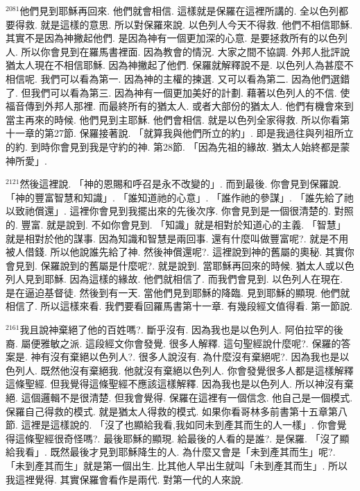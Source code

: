 \documentclass{book}
\begin{document}
$^{2081}$他們見到耶穌再回來.
他們就會相信.
這樣就是保羅在這裡所講的.
全以色列都要得救.
就是這樣的意思.
所以對保羅來說.
以色列人今天不得救.
他們不相信耶穌.
其實不是因為神撇起他們.
是因為神有一個更加深的心意.
是要拯救所有的以色列人.
所以你會見到在羅馬書裡面.
因為教會的情況.
大家之間不協調.
外邦人批評說猶太人現在不相信耶穌.
因為神撇起了他們.
保羅就解釋說不是.
以色列人為甚麼不相信呢.
我們可以看為第一.
因為神的主權的揀選.
又可以看為第二.
因為他們選錯了.
但我們可以看為第三.
因為神有一個更加美好的計劃.
藉著以色列人的不信.
使福音傳到外邦人那裡.
而最終所有的猶太人.
或者大部份的猶太人.
他們有機會來到當主再來的時候.
他們見到主耶穌.
他們會相信.
就是以色列全家得救.
所以你看第十一章的第27節.
保羅接著說.
「就算我與他們所立的約」.
即是我過往與列祖所立的約.
到時你會見到我是守約的神.
第28節.
「因為先祖的緣故.
猶太人始終都是蒙神所愛」.

$^{2121}$然後這裡說.
「神的恩賜和呼召是永不改變的」.
而到最後.
你會見到保羅說.
「神的豐富智慧和知識」.
「誰知道祂的心意」.
「誰作祂的參謀」.
「誰先給了祂 以致祂償還」.
這裡你會見到我擺出來的先後次序.
你會見到是一個很清楚的.
對照的.
豐富.
就是說到.
不如你會見到.
「知識」就是相對於知道心的主義.
「智慧」就是相對於他的謀事.
因為知識和智慧是兩回事.
還有什麼叫做豐富呢?.
就是不用被人借錢.
所以他說誰先給了神.
然後神償還呢?.
這裡說到神的舊屬的奧秘.
其實你會見到.
保羅說到的舊屬是什麼呢?.
就是說到.
當耶穌再回來的時候.
猶太人或以色列人見到耶穌.
因為這樣的緣故.
他們就相信了.
而我們會見到.
以色列人在現在.
是在逼迫基督徒.
然後到有一天.
當他們見到耶穌的降臨.
見到耶穌的顯現.
他們就相信了.
所以這樣來看.
我們要看回羅馬書第十一章.
有幾段經文值得看.
第一節說.

$^{2161}$我且說神棄絕了他的百姓嗎?.
斷乎沒有.
因為我也是以色列人.
阿伯拉罕的後裔.
屬便雅敏之派.
這段經文你會發覺.
很多人解釋.
這句聖經說什麼呢?.
保羅的答案是.
神有沒有棄絕以色列人?.
很多人說沒有.
為什麼沒有棄絕呢?.
因為我也是以色列人.
既然他沒有棄絕我.
他就沒有棄絕以色列人.
你會發覺很多人都是這樣解釋這條聖經.
但我覺得這條聖經不應該這樣解釋.
因為我也是以色列人.
所以神沒有棄絕.
這個邏輯不是很清楚.
但我會覺得.
保羅在這裡有一個信念.
他自己是一個模式.
保羅自己得救的模式.
就是猶太人得救的模式.
如果你看哥林多前書第十五章第八節.
這裡是這樣說的.
「沒了也顯給我看,我如同未到產其而生的人一樣」.
你會覺得這條聖經很奇怪嗎?.
最後耶穌的顯現.
給最後的人看的是誰?.
是保羅.
「沒了顯給我看」.
既然最後才見到耶穌降生的人.
為什麼又會是「未到產其而生」呢?.
「未到產其而生」就是第一個出生.
比其他人早出生就叫「未到產其而生」.
所以我這裡覺得.
其實保羅會看作是兩代.
對第一代的人來說.
\end{document}
